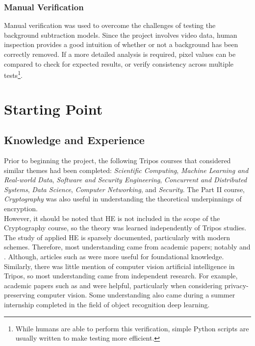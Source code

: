 \setlength{\leftskip}{0cm}
\subsubsection{Manual Verification}
\setlength{\leftskip}{0.5cm}
\indent \indent
Manual verification was used to overcome the challenges of testing the background subtraction models. Since the project involves video data, human inspection provides a good intuition of whether or not a background has been correctly removed. If a more detailed analysis is required, pixel values can be compared to check for expected results, or verify consistency across multiple tests\footnote{While humans are able to perform this verification, simple Python scripts are usually written to make testing more efficient.}. 

\setlength{\leftskip}{0cm}





\section{Starting Point}
\label{sec:startingPoint}

\subsection{Knowledge and Experience}
\setlength{\leftskip}{0.5cm}
\indent \indent
Prior to beginning the project, the following Tripos courses that considered similar themes had been completed: \textit{Scientific Computing}, \textit{Machine Learning and Real-world Data}, \textit{Software and Security Engineering}, \textit{Concurrent and Distributed Systems}, \textit{Data Science}, \textit{Computer Networking}, and \textit{Security}. The Part II course, \textit{Cryptography} was also useful in understanding the theoretical underpinnings of encryption.
\smallskip \\ \indent
However, it should be noted that HE is not included in the scope of the Cryptography course, so the theory was learned independently of Tripos studies. The study of applied HE is sparsely documented, particularly with modern schemes. Therefore, most understanding came from academic papers; notably \cite{CKKS} and \cite{SEAL}. Although, articles such as \cite{BrilliantHE} were more useful for foundational knowledge.
\smallskip \\ \indent
Similarly, there was little mention of computer vision artificial intelligence in Tripos, so most understanding came from independent research. For example, academic papers such as \cite{Stauffer} and \cite{Kulchandani} were helpful, particularly when considering privacy-preserving computer vision. Some understanding also came during a summer internship completed in the field of object recognition deep learning.

